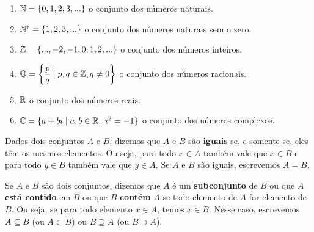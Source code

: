 \documentclass{beamer}
\begin{document}
    \begin{frame}
        \begin{enumerate}[label={\arabic*})]
            \item $\mathbb{N} = \{0,1,2,3,...\}$ o conjunto dos n{\'u}meros naturais.\pause
            \vspace{.3cm}
            \item $\mathbb{N}^* = \{1,2,3,...\}$ o conjunto dos n{\'u}meros naturais sem o zero.\pause
            \vspace{.3cm}
            \item $\mathbb{Z} = \{...,-2,-1,0,1,2,...\}$ o conjunto dos n{\'u}meros inteiros.\pause
            \vspace{.3cm}
            \item $\mathbb{Q} = \left\{\dfrac{p}{q} \mid p,q \in \mathbb{Z}, q \neq 0 \right\}$ o conjunto dos n{\'u}meros racionais.\pause
            \vspace{.3cm}
            \item $\mathbb{R} $ o conjunto dos n{\'u}meros reais.\pause
            \vspace{.3cm}
            \item $\mathbb{C} = \{a + bi \mid a,b \in \mathbb{R},\ i^2 = -1\}$ o conjunto dos n\'umeros complexos.
        \end{enumerate}
    \end{frame}

    \begin{frame}
        \begin{definicao}
            Dados dois conjuntos $A$ e $B$, \pause dizemos que $A$ e $B$ s{\~a}o \textbf{iguais} \pause se, e somente se, eles t{\^e}m os mesmos elementos. \pause Ou seja, para todo $x \in A$ tamb\'em vale que $x \in B$ \pause e para todo $y \in B$ tamb\'em vale que $y \in A$. \pause Se $A$ e $B$ s{\~a}o iguais, \pause escrevemos $A = B$.\pause
        \end{definicao}

        \begin{definicao}
            Se $A$ e $B$ s{\~a}o dois conjuntos, \pause dizemos que $A$ {\'e} um \textbf{subconjunto} de $B$ \pause ou que $A$ \textbf{est\'a contido} em $B$ \pause ou que $B$ \textbf{cont\'em} $A$ \pause se todo elemento de $A$ for elemento de $B$. \pause Ou seja, se para todo elemento $x \in A$, \pause temos $x \in B$. \pause Nesse caso, escrevemos $A \subseteq B$ (ou $A \subset B$) \pause ou $B \supseteq A$ (ou $B \supset A$).
        \end{definicao}
    \end{frame}
\end{document}
